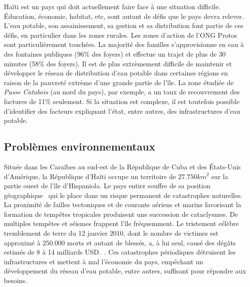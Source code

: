 \documentclass{eplmastersthesis_FR}
\begin{document}

			Haïti est un pays qui doit actuellement faire face à une situation difficile. \'Education, économie, habitat, etc, sont autant de défis que le pays devra relever. L'eau potable, son assainissement, sa gestion et sa distribution font partie de ces défis, en particulier dans les zones rurales. Les zones d'action de l'ONG Protos sont particulièrement touchées. La majorité des familles s'approvisionne en eau à des fontaines publiques (96\% des foyers) et effectue un trajet de plus de 30 minutes (58\% des foyers). Il est de plus extrèmement difficile de maintenir et développer le réseau de distribution d'eau potable dans certaines régions en raison de la pauvreté extrème d'une grande partie de l'île. La zone étudiée de \emph{Passe Catabois} (au nord du pays), par exemple, a un taux de recouvrement des factures de 11\% seulement. Si la situation est complexe, il est toutefois possible d'identifier des facteurs expliquant l'état, entre autres, des infrastructures d'eau potable.

			\subsection*{Problèmes environnementaux}

				Située dans les Caraïbes au sud-est de la République de Cuba et des \'Etats-Unis d'Amérique, la République d'Haïti occupe un territoire de $27.750km^{2}$ sur la partie ouest de l'île d'Hispaniola. Le pays entier souffre de sa position géographique~\cite{ref:regards_situation_eau_haiti} qui le place dans un risque permanent de catastrophes naturelles. La proximité de failles tectoniques et de courants aériens et marins favorisant la formation de tempêtes tropicales produisent une succession de cataclysmes. De multiples tempêtes et séismes frappent l'île fréquemment. Le tristement célèbre tremblement de terre du 12 janvier 2010, dont le nombre de victimes est approximé à $250.000$ morts et autant de blessés, a, à lui seul, causé des dégâts estimés de 8 à 14 milliards USD.~\cite{ref:estimating_economic_damage_earthquake_haiti}. Ces catastrophes périodiques détruisent les infrastructures et mettent à mal l'économie du pays, empêchant un développement du réseau d'eau potable, entre autres, suffisant pour répondre aux besoins.
\end{document}
